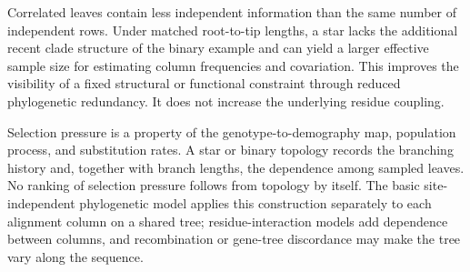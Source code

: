Correlated leaves contain less independent information than the same number of independent rows.
Under matched root-to-tip lengths, a star lacks the additional recent clade structure of the binary
example and can yield a larger effective sample size for estimating column frequencies and
covariation.  This improves the visibility of a fixed structural or functional constraint through
reduced phylogenetic redundancy.  It does not increase the underlying residue coupling.

Selection pressure is a property of the genotype-to-demography map, population process, and
substitution rates.  A star or binary topology records the branching history and, together with branch lengths,
the dependence among sampled leaves.  No ranking of selection pressure follows from topology by
itself.  The basic site-independent phylogenetic model applies this construction separately to
each alignment column on a shared tree; residue-interaction models add dependence between columns,
and recombination or gene-tree discordance may make the tree vary along the sequence.
